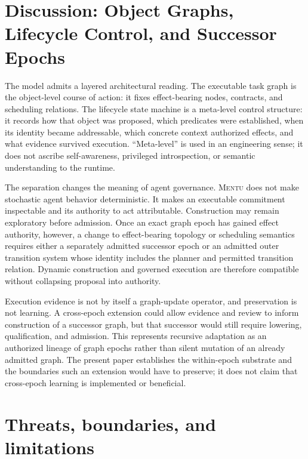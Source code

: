 \documentclass[11pt]{article}
\newcommand{\mentu}{\textsc{Mentu}}
\begin{document}
\section{Discussion: Object Graphs, Lifecycle Control, and Successor Epochs}

The model admits a layered architectural reading.  The executable task graph is
the object-level course of action: it fixes effect-bearing nodes, contracts, and
scheduling relations.  The lifecycle state machine is a meta-level control
structure: it records how that object was proposed, which predicates were
established, when its identity became addressable, which concrete context
authorized effects, and what evidence survived execution.  ``Meta-level'' is
used in an engineering sense; it does not ascribe self-awareness, privileged
introspection, or semantic understanding to the runtime.

The separation changes the meaning of agent governance.  \mentu{} does not make
stochastic agent behavior deterministic.  It makes an executable commitment
inspectable and its authority to act attributable.  Construction may remain
exploratory before admission.  Once an exact graph epoch has gained effect
authority, however, a change to effect-bearing topology or scheduling semantics
requires either a separately admitted successor epoch or an admitted outer
transition system whose identity includes the planner and permitted transition
relation.  Dynamic construction and governed execution are therefore
compatible without collapsing proposal into authority.

Execution evidence is not by itself a graph-update operator, and preservation
is not learning.  A cross-epoch extension could allow evidence and review to
inform construction of a successor graph, but that successor would still
require lowering, qualification, and admission.  This represents recursive
adaptation as an authorized lineage of graph epochs rather than silent mutation
of an already admitted graph.  The present paper establishes the within-epoch
substrate and the boundaries such an extension would have to preserve; it does
not claim that cross-epoch learning is implemented or beneficial.

\section{Threats, boundaries, and limitations}
\end{document}
